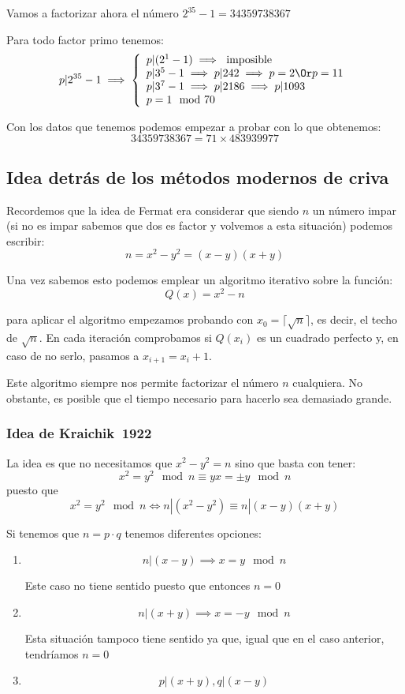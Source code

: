 \begin{example}
Vamos a factorizar ahora el número $2^{35}-1=34359738367$

Para todo factor primo tenemos:
\[p|2^{35}-1 \implies \left\{ \begin{array}{l}p|(2^1-1)\implies \text{ imposible}\\
p|3^5-1 \implies p|242 \implies p=2 \Or p=11\\
p|3^7-1 \implies p |2186 \implies  p|1093\\
p =1 \mod 70 \end{array}\right.\]

Con los datos que tenemos podemos empezar a probar con lo que obtenemos:
\[34359738367 = 71 \times 483939977\]
\end{example}

\subsection{Idea detrás de los métodos modernos de criva}

Recordemos que la idea de Fermat era considerar que siendo $n$ un número impar (si no es impar sabemos que dos es factor y volvemos a esta situación) podemos escribir:
\[n = x^2-y^2 = (x-y)(x+y)\]

Una vez sabemos esto podemos emplear un algoritmo iterativo sobre la función:
\[Q(x) = x^2 - n\]

para aplicar el algoritmo empezamos probando con $x_0 = \lceil\sqrt{n}\rceil$, es decir, el techo de $\sqrt{n}$. En cada iteración comprobamos si $Q(x_i)$ es un cuadrado perfecto y, en caso de no serlo, pasamos a $x_{i+1}=x_i+1$.

Este algoritmo siempre nos permite factorizar el número $n$ cualquiera. No obstante, es posible que el tiempo necesario para hacerlo sea demasiado grande.

\subsubsection{Idea de Kraichik~1922}
La idea es que no necesitamos que $x^2-y^2 =n$ sino que basta con tener:
\[x^2 = y^2 \mod n \equiv yx = \pm y \mod n\]
puesto que
\[x^2 = y^2 \mod n \iff n|(x^2-y^2) \equiv n|(x-y)(x+y)\]

Si tenemos que $n=p\cdot q$ tenemos diferentes opciones:
\begin{enumerate}
\item
\[n|(x-y) \implies x=y \mod n\]

Este caso no tiene sentido puesto que entonces $n=0$

\item
\[n|(x+y) \implies x=-y \mod n\]

Esta situación tampoco tiene sentido ya que, igual que en el caso anterior, tendríamos $n=0$

\item
\[p|(x+y), q|(x-y)\]
\end{enumerate}

